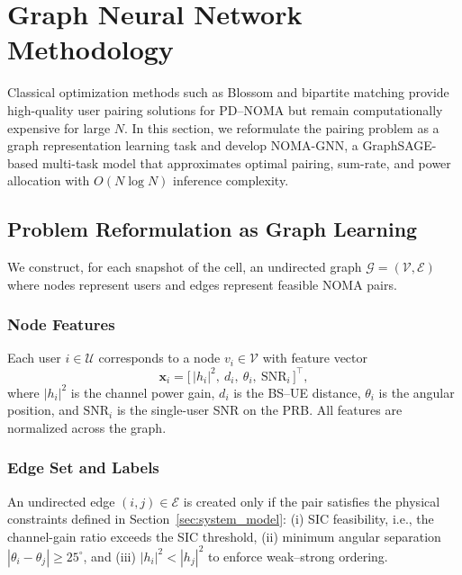 \section{Graph Neural Network Methodology}
\label{sec:gnn_methodology}

Classical optimization methods such as Blossom and bipartite matching provide high-quality user pairing solutions for PD–NOMA but remain computationally expensive for large $N$. In this section, we reformulate the pairing problem as a graph representation learning task and develop NOMA-GNN, a GraphSAGE-based multi-task model that approximates optimal pairing, sum-rate, and power allocation with $O(N \log N)$ inference complexity.

\subsection{Problem Reformulation as Graph Learning}

We construct, for each snapshot of the cell, an undirected graph
$\mathcal{G} = (\mathcal{V}, \mathcal{E})$ where nodes represent users and edges represent feasible NOMA pairs.

\subsubsection{Node Features}

Each user $i \in \mathcal{U}$ corresponds to a node $v_i \in \mathcal{V}$ with feature vector
\begin{equation}
\mathbf{x}_i = 
\big[\, |h_i|^2,\ d_i,\ \theta_i,\ \text{SNR}_i \,\big]^\top,
\end{equation}
where $|h_i|^2$ is the channel power gain, $d_i$ is the BS–UE distance, $\theta_i$ is the angular position, and $\text{SNR}_i$ is the single-user SNR on the PRB. All features are normalized across the graph.

\subsubsection{Edge Set and Labels}

An undirected edge $(i,j) \in \mathcal{E}$ is created only if the pair satisfies the physical constraints defined in Section~\ref{sec:system_model}:
(i) SIC feasibility, i.e., the channel-gain ratio exceeds the SIC threshold,
(ii) minimum angular separation $|\theta_i - \theta_j| \ge 25^\circ$, and
(iii) $|h_i|^2 < |h_j|^2$ to enforce weak–strong ordering.

